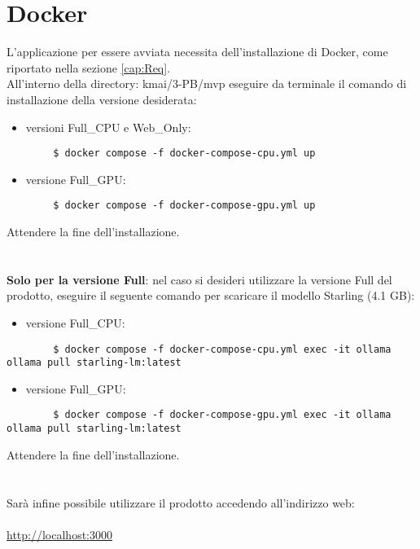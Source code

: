 \section{Docker}
L'applicazione per essere avviata necessita dell'installazione di Docker, come riportato nella sezione \ref{cap:Req}.\\
All'interno della directory: kmai/3-PB/mvp eseguire da terminale il comando di installazione della versione desiderata:
\vspace{-0.3cm}
\begin{itemize}
    \item versioni Full\_CPU e Web\_Only:
\end{itemize}
\vspace{-0.4cm}
    \begin{lstlisting}
        $ docker compose -f docker-compose-cpu.yml up
    \end{lstlisting}
\vspace{-0.4cm}
\begin{itemize}
    \item versione Full\_GPU:
\end{itemize}
\vspace{-0.4cm}
    \begin{lstlisting}
        $ docker compose -f docker-compose-gpu.yml up
    \end{lstlisting}
Attendere la fine dell'installazione.\\ \\ \\
\textbf{Solo per la versione Full}: nel caso si desideri utilizzare la versione Full del prodotto, eseguire il seguente comando per scaricare il modello Starling (4.1 GB):
\vspace{-0.3cm}
\begin{itemize}
    \item versione Full\_CPU:
\end{itemize}
\vspace{-0.4cm}
    \begin{lstlisting}
        $ docker compose -f docker-compose-cpu.yml exec -it ollama ollama pull starling-lm:latest
    \end{lstlisting}
\vspace{-0.4cm}
\begin{itemize}
    \item versione Full\_GPU:
\end{itemize}
\vspace{-0.4cm}
    \begin{lstlisting}
        $ docker compose -f docker-compose-gpu.yml exec -it ollama ollama pull starling-lm:latest
    \end{lstlisting}
Attendere la fine dell'installazione.\\ \\ \\

\noindent Sarà infine possibile utilizzare il prodotto accedendo all'indirizzo web: \\ \\
\url{http://localhost:3000}

